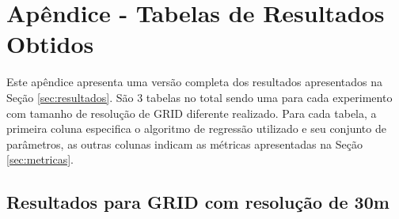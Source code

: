 \section{Apêndice - Tabelas de Resultados Obtidos}
\label{appendix:fulltables}

Este apêndice apresenta uma versão completa dos resultados apresentados na Seção \ref{sec:resultados}. São 3 tabelas no total sendo uma para cada experimento com tamanho de resolução de GRID diferente realizado. Para cada tabela, a primeira coluna especifica o algoritmo de regressão utilizado e seu conjunto de parâmetros, as outras colunas indicam as métricas apresentadas na Seção \ref{sec:metricas}.


\subsection{Resultados para GRID com resolução de 30m}   
\label{appendix:fulltable30m}

